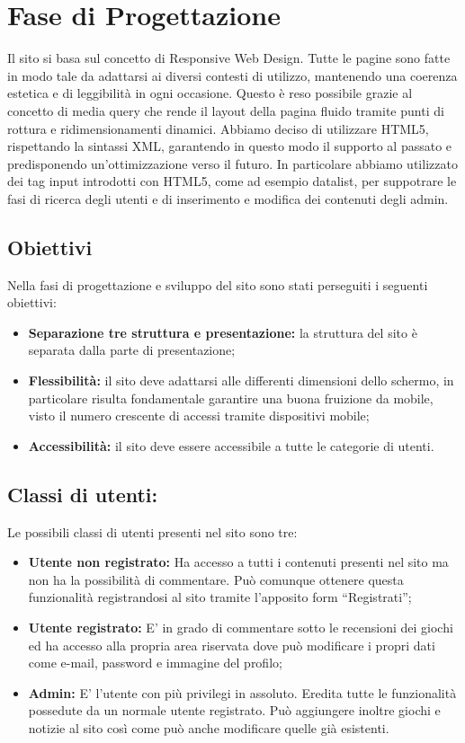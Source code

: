 \section{ Fase di Progettazione}

Il sito si basa sul concetto di Responsive Web Design. Tutte le pagine sono fatte in modo tale da adattarsi ai diversi contesti di utilizzo, mantenendo una coerenza estetica e di leggibilità in ogni occasione. Questo è reso possibile grazie al concetto di media query che rende il layout della pagina fluido tramite punti di rottura e ridimensionamenti dinamici. 
Abbiamo deciso di utilizzare HTML5, rispettando la sintassi XML, garantendo in questo modo il supporto al passato e predisponendo un'ottimizzazione verso il futuro.
In particolare abbiamo utilizzato dei tag input introdotti con HTML5, come ad esempio datalist, per suppotrare le fasi di ricerca degli utenti e di inserimento e modifica dei contenuti degli admin. 

\subsection{Obiettivi}
Nella fasi di progettazione e sviluppo del sito sono stati perseguiti i seguenti obiettivi:
\begin{itemize}
	\item  \textbf{Separazione tre struttura e presentazione:} la struttura del sito è separata dalla parte di presentazione;
	\item  \textbf{Flessibilità:} il sito deve adattarsi alle differenti dimensioni dello schermo, in particolare risulta fondamentale garantire una buona fruizione da mobile, visto il numero crescente di accessi tramite dispositivi mobile;
	\item  \textbf{Accessibilità:} il sito deve essere accessibile a tutte le categorie di utenti.
\end{itemize}

\subsection{Classi di utenti:}
Le possibili classi di utenti presenti nel sito sono tre:
\begin{itemize}
	\item \textbf{Utente non registrato:} Ha accesso a tutti i contenuti presenti nel sito ma non ha la possibilità di commentare. Può comunque ottenere questa funzionalità registrandosi al sito tramite l'apposito form “Registrati”;
	\item \textbf{Utente registrato:} E' in grado di commentare sotto le recensioni dei giochi ed ha accesso alla propria area riservata dove può modificare i propri dati come e-mail, password e immagine del profilo;
	\item  \textbf{Admin:} E' l'utente con più privilegi in assoluto. Eredita tutte le funzionalità possedute da un normale utente registrato. Può aggiungere inoltre giochi e notizie al sito così come può anche modificare quelle già esistenti.
\end{itemize}

